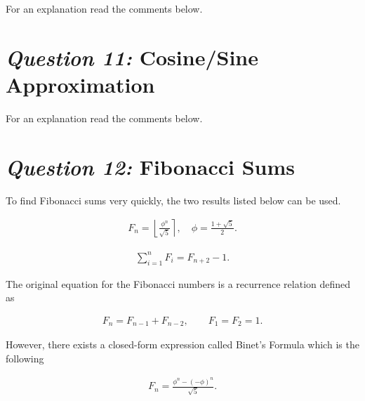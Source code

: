 \documentclass[12pt]{article}
\newcommand{\round}[1]{\left\lfloor #1 \right\rceil}
\begin{document}
For an explanation read the comments below.







\section{\textit{Question 11:} Cosine/Sine Approximation}

For an explanation read the comments below.







\section{\textit{Question 12:} Fibonacci Sums}

To find Fibonacci sums very quickly, the two results listed
below \cite{wikifib} can be used.

\begin{align}
  F_n = \round{\frac{\phi^n}{\sqrt{5}}}, \quad \phi = \frac{1 +
  \sqrt{5}}{2}. \label{fib_num}
\end{align}

\begin{align}
  \sum_{i=1}^{n} F_i = F_{n+2} - 1. \label{fib_sum}
\end{align}

The original equation for the Fibonacci numbers is a recurrence
relation defined as

\begin{align}
  F_n = F_{n-1} + F_{n-2}, \qquad F_1 = F_2 = 1. \label{fib_def}
\end{align}

However, there exists a closed-form expression called Binet's
Formula \cite{wolframfib} which is the following

\begin{align*}
  F_n = \frac{\phi^n - (-\phi)^n}{\sqrt{5}}.
\end{align*}
\end{document}
